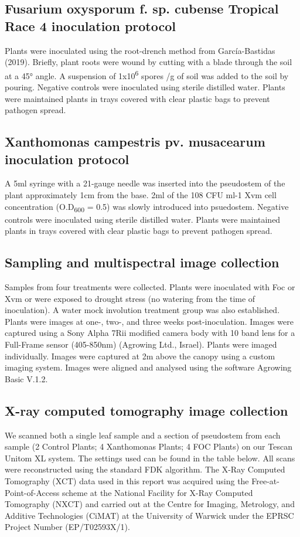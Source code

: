 \subsection{Fusarium oxysporum f. sp. cubense Tropical Race 4 inoculation protocol}
Plants were inoculated using the root-drench method from García-Bastidas \et (2019). Briefly, plant roots were wound by cutting with a blade through the soil at a 45° angle. A suspension of 1x10\textsuperscript{6} spores /g of soil was added to the soil by pouring. Negative controls were inoculated using sterile distilled water. Plants were maintained plants in trays covered with clear plastic bags to prevent pathogen spread. 

\subsection{Xanthomonas campestris pv. musacearum inoculation protocol}
A 5ml syringe with a 21-gauge needle was inserted into the pseudostem of the plant approximately 1cm from the base. 2ml of the 108 CFU ml-1 Xvm cell concentration (O.D\textsubscript{600} = 0.5) was slowly introduced into psuedostem. Negative controls were inoculated using sterile distilled water. Plants were maintained plants in trays covered with clear plastic bags to prevent pathogen spread. 


\subsection{Sampling and multispectral image collection}
Samples from four treatments were collected. Plants were inoculated with Foc or Xvm or were exposed to drought stress (no watering from the time of inoculation). A water mock involution treatment group was also established. Plants were images at one-, two-, and three weeks post-inoculation. 
Images were captured using a Sony Alpha 7Rii modified camera body with 10 band lens for a Full-Frame sensor (405-850nm) (Agrowing Ltd., Israel). Plants were imaged individually. Images were captured at 2m above the canopy using a custom imaging system. Images were aligned and analysed using the software Agrowing Basic V.1.2.
\subsection{X-ray computed tomography image collection}
We scanned both a single leaf sample and a section of pseudostem from each sample (2 Control Plants; 4 Xanthomonas Plants; 4 FOC Plants) on our Tescan Unitom XL system. The settings used can be found in the table below. All scans were reconstructed using the standard FDK algorithm.
The X-Ray Computed Tomography (XCT) data used in this report was acquired using the Free-at-Point-of-Access scheme at the National Facility for X-Ray Computed Tomography (NXCT) and carried out at the Centre for Imaging, Metrology, and Additive Technologies (CiMAT) at the University of Warwick under the EPRSC Project Number (EP/T02593X/1).

